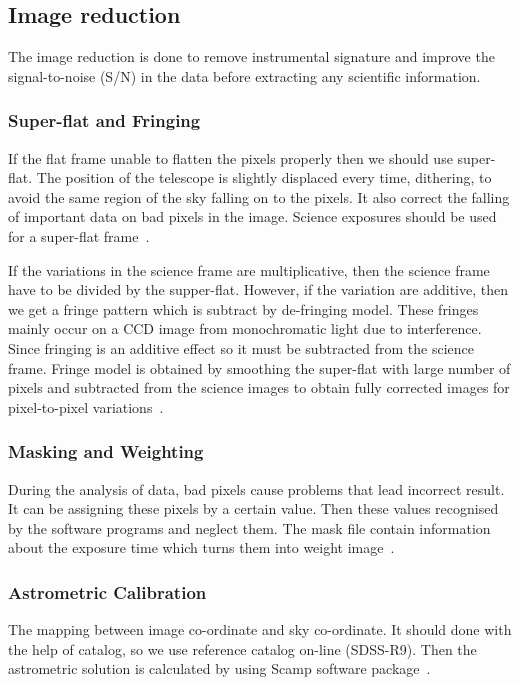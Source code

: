 \subsection{Image reduction}
The image reduction is done to remove instrumental signature and improve the signal-to-noise (S/N) in the data before extracting any scientific information\cite{manual}.
\subsubsection{Super-flat and Fringing}
If the flat frame unable to flatten the pixels properly then we should use super-flat. The position of the telescope is slightly displaced every time, dithering, to avoid the same region of the sky falling on to the pixels. It also correct the falling of important data on bad pixels in the image. Science exposures should be used for a super-flat frame~\cite{manual}.

If the variations in the science frame are multiplicative, then the science frame  have to be divided by the supper-flat. However, if the variation are additive, then  we get a fringe pattern which is subtract by de-fringing model. These fringes mainly occur on a CCD image from monochromatic light due to interference. Since fringing is an additive effect so it must be subtracted from the science frame. Fringe model is obtained by smoothing the super-flat with large number of pixels and subtracted from the science images to obtain fully corrected images for pixel-to-pixel variations~\cite{manual}.

\subsubsection{Masking and Weighting }
During the analysis of data, bad pixels cause problems that lead incorrect result. It can be assigning these pixels by a certain value. Then these values recognised by the software programs and neglect them. 
The mask file contain information about the exposure time which turns them into weight image~\cite{manual}. 
\subsubsection{Astrometric Calibration}
The mapping between image co-ordinate and sky co-ordinate. It should done with the help of catalog, so we use reference catalog on-line (SDSS-R9). Then the astrometric solution is calculated by using Scamp software package~\cite{manual}.
